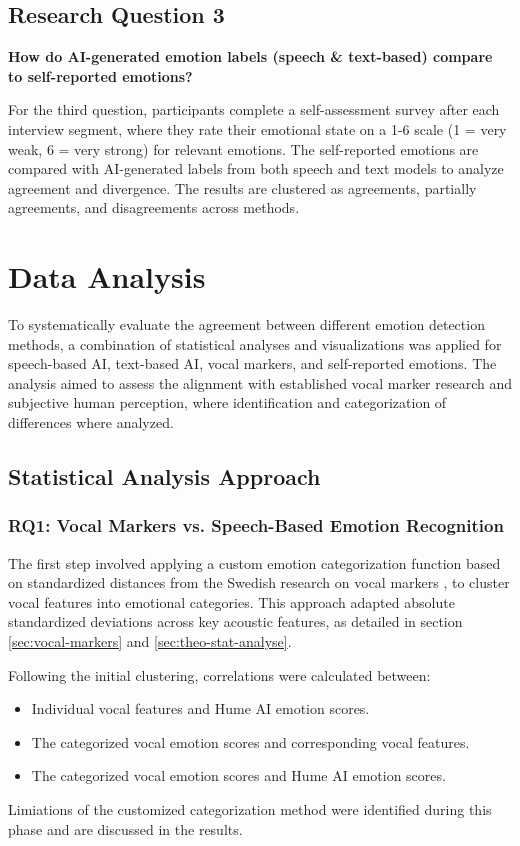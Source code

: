 \subsection{Research Question 3}
\textbf{How do AI-generated emotion labels (speech \& text-based) compare to self-reported emotions? }

For the third question, participants complete a self-assessment survey after each interview segment, where they rate their emotional state on a 1-6 scale (1 = very weak, 6 = very strong) for relevant emotions. The self-reported emotions are compared with AI-generated labels from both speech and text models to analyze agreement and divergence. The results are clustered as agreements, partially agreements, and disagreements across methods. 


\section{Data Analysis}
To systematically evaluate the agreement between different emotion detection methods, a combination of statistical analyses and visualizations was applied for speech-based AI, text-based AI, vocal markers, and self-reported emotions. 
The analysis aimed to assess the alignment with established vocal marker research and subjective human perception, where identification and categorization of differences where analyzed. 

\subsection{Statistical Analysis Approach}
\subsubsection{RQ1: Vocal Markers vs. Speech-Based Emotion Recognition}
The first step involved applying a custom emotion categorization function based on standardized distances from the Swedish research on vocal markers \autocite{Ekberg2023}, to cluster vocal features into emotional categories. This approach adapted 
absolute standardized deviations across key acoustic features, as detailed in section \ref{sec:vocal-markers} and \ref{sec:theo-stat-analyse}. 

Following the initial clustering, correlations were calculated between: 
\begin{itemize}
    \item Individual vocal features and Hume AI emotion scores. 
    \item The categorized vocal emotion scores and corresponding vocal features. 
    \item The categorized vocal emotion scores and Hume AI emotion scores.
\end{itemize}
Limiations of the customized categorization method were identified during this phase and are discussed in the results. 

